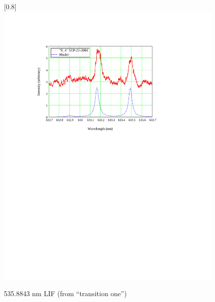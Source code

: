 \begin{figure}
\scalebox{0.8}[0.8]{
\includegraphics[bb=10 450 489 685]
{fl_4/fl_4.pdf}
}
\caption{535.8843 nm LIF (from ``transition one'')}
\label{fl_4}
\end{figure}
